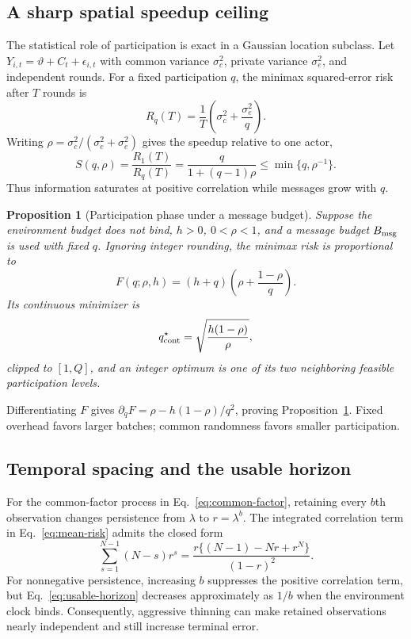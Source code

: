 \documentclass[journal]{IEEEtran}
\newtheorem{proposition}{Proposition}
\begin{document}
\subsection{A sharp spatial speedup ceiling}
The statistical role of participation is exact in a Gaussian location subclass.
Let $Y_{i,t}=\vartheta+C_t+\epsilon_{i,t}$ with common variance $\sigma_c^2$, private variance $\sigma_e^2$, and independent rounds.
For a fixed participation $q$, the minimax squared-error risk after $T$ rounds is
\begin{equation}
R_q(T)=\frac{1}{T}\left(\sigma_c^2+\frac{\sigma_e^2}{q}\right).
\label{eq:location-risk}
\end{equation}
Writing $\rho=\sigma_c^2/(\sigma_c^2+\sigma_e^2)$ gives the speedup relative to one actor,
\begin{equation}
S(q,\rho)=\frac{R_1(T)}{R_q(T)}
=\frac{q}{1+(q-1)\rho}
\le\min\{q,\rho^{-1}\}.
\label{eq:speedup}
\end{equation}
Thus information saturates at positive correlation while messages grow with $q$.

\begin{proposition}[Participation phase under a message budget]
Suppose the environment budget does not bind, $h>0$, $0<\rho<1$, and a message budget $B_{\rm msg}$ is used with fixed $q$.
Ignoring integer rounding, the minimax risk is proportional to
\begin{equation}
F(q;\rho,h)=(h+q)\left(\rho+\frac{1-\rho}{q}\right).
\label{eq:participation-phase-objective}
\end{equation}
Its continuous minimizer is
\begin{equation}
q_{\rm cont}^\star=\sqrt{\frac{h(1-\rho)}{\rho}},
\label{eq:participation-phase}
\end{equation}
clipped to $[1,Q]$, and an integer optimum is one of its two neighboring feasible participation levels.
\label{prop:q-phase}
\end{proposition}

Differentiating $F$ gives $\partial_qF=\rho-h(1-\rho)/q^2$, proving Proposition~\ref{prop:q-phase}.
Fixed overhead favors larger batches; common randomness favors smaller participation.

\subsection{Temporal spacing and the usable horizon}
For the common-factor process in Eq.~\eqref{eq:common-factor}, retaining every $b$th observation changes persistence from $\lambda$ to $r=\lambda^b$.
The integrated correlation term in Eq.~\eqref{eq:mean-risk} admits the closed form
\begin{equation}
\sum_{s=1}^{N-1}(N-s)r^s
=\frac{r\{(N-1)-Nr+r^N\}}{(1-r)^2}.
\label{eq:geometric-correlation-sum}
\end{equation}
For nonnegative persistence, increasing $b$ suppresses the positive correlation term, but Eq.~\eqref{eq:usable-horizon} decreases approximately as $1/b$ when the environment clock binds.
Consequently, aggressive thinning can make retained observations nearly independent and still increase terminal error.
\end{document}
